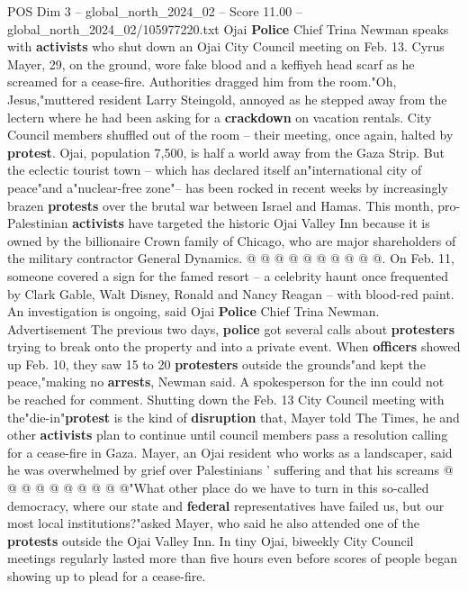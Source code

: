 \begin{textsample}{POS Dim 3 – global\_north\_2024\_02 – Score 11.00 – global\_north\_2024\_02/105977220.txt}  \label{ex:f3_pos_254}
Ojai \textbf{Police} Chief Trina Newman speaks with \textbf{activists} who shut down an Ojai City Council meeting on Feb. 13.
Cyrus Mayer, 29, on the ground, wore fake blood and a keffiyeh head scarf as he screamed for a cease-fire.
Authorities dragged him from the room."Oh, Jesus,"muttered resident Larry Steingold, annoyed as he stepped away from the lectern where he had been asking for a \textbf{crackdown} on vacation rentals.
City Council members shuffled out of the room -- their meeting, once again, halted by \textbf{protest}.
Ojai, population 7,500, is half a world away from the Gaza Strip.
But the eclectic tourist town -- which has declared itself an"international city of peace"and a"nuclear-free zone"-- has been rocked in recent weeks by increasingly brazen \textbf{protests} over the brutal war between Israel and Hamas.
This month, pro-Palestinian \textbf{activists} have targeted the historic Ojai Valley Inn because it is owned by the billionaire Crown family of Chicago, who are major shareholders of the military contractor General Dynamics. @ @ @ @ @ @ @ @ @ @.
On Feb. 11, someone covered a sign for the famed resort -- a celebrity haunt once frequented by Clark Gable, Walt Disney, Ronald and Nancy Reagan -- with blood-red paint.
An investigation is ongoing, said Ojai \textbf{Police} Chief Trina Newman.
Advertisement The previous two days, \textbf{police} got several calls about \textbf{protesters} trying to break onto the property and into a private event.
When \textbf{officers} showed up Feb. 10, they saw 15 to 20 \textbf{protesters} outside the grounds"and kept the peace,"making no \textbf{arrests}, Newman said.
A spokesperson for the inn could not be reached for comment.
Shutting down the Feb. 13 City Council meeting with the"die-in"\textbf{protest} is the kind of \textbf{disruption} that, Mayer told The Times, he and other \textbf{activists} plan to continue until council members pass a resolution calling for a cease-fire in Gaza.
Mayer, an Ojai resident who works as a landscaper, said he was overwhelmed by grief over Palestinians ' suffering and that his screams @ @ @ @ @ @ @ @ @ @"What other place do we have to turn in this so-called democracy, where our state and \textbf{federal} representatives have failed us, but our most local institutions?"asked Mayer, who said he also attended one of the \textbf{protests} outside the Ojai Valley Inn.
In tiny Ojai, biweekly City Council meetings regularly lasted more than five hours even before scores of people began showing up to plead for a cease-fire.

\end{textsample}
